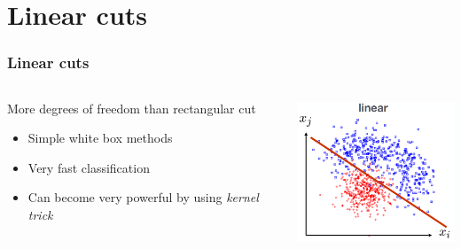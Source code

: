 \documentclass{beamer}
\begin{document}

\section{Linear cuts}

\begin{frame}
    \frametitle{Linear cuts}
    \begin{columns}[T] %
        \begin{column}{.48\textwidth}
            More degrees of freedom than rectangular cut
            \begin{itemize}
                \item<1-> Simple white box methods 
                \item<2-> Very fast classification
                \item<3-> Can become very powerful by using \emph{kernel trick}
            \end{itemize}
        \end{column}%
        \hfill%
        \begin{column}{.48\textwidth}
            \raggedright\includegraphics[height=4.3cm,keepaspectratio]{pics/mva_cut_linear.png}%
            
        \end{column}%
    \end{columns}

\end{frame} 

\end{document}
